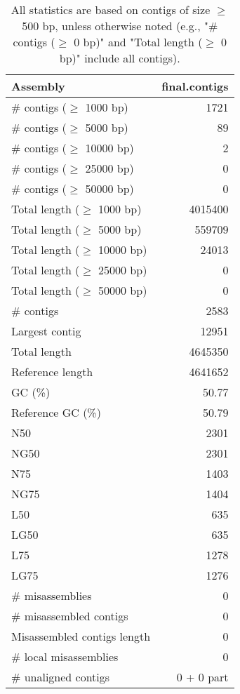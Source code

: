 \documentclass[12pt,a4paper]{article}
\begin{document}
\begin{table}[ht]
\begin{center}
\caption{All statistics are based on contigs of size $\geq$ 500 bp, unless otherwise noted (e.g., "\# contigs ($\geq$ 0 bp)" and "Total length ($\geq$ 0 bp)" include all contigs).}
\begin{tabular}{|l*{1}{|r}|}
\hline
Assembly & final.contigs \\ \hline
\# contigs ($\geq$ 1000 bp) & 1721 \\ \hline
\# contigs ($\geq$ 5000 bp) & 89 \\ \hline
\# contigs ($\geq$ 10000 bp) & 2 \\ \hline
\# contigs ($\geq$ 25000 bp) & 0 \\ \hline
\# contigs ($\geq$ 50000 bp) & 0 \\ \hline
Total length ($\geq$ 1000 bp) & 4015400 \\ \hline
Total length ($\geq$ 5000 bp) & 559709 \\ \hline
Total length ($\geq$ 10000 bp) & 24013 \\ \hline
Total length ($\geq$ 25000 bp) & 0 \\ \hline
Total length ($\geq$ 50000 bp) & 0 \\ \hline
\# contigs & 2583 \\ \hline
Largest contig & 12951 \\ \hline
Total length & 4645350 \\ \hline
Reference length & 4641652 \\ \hline
GC (\%) & 50.77 \\ \hline
Reference GC (\%) & 50.79 \\ \hline
N50 & 2301 \\ \hline
NG50 & 2301 \\ \hline
N75 & 1403 \\ \hline
NG75 & 1404 \\ \hline
L50 & 635 \\ \hline
LG50 & 635 \\ \hline
L75 & 1278 \\ \hline
LG75 & 1276 \\ \hline
\# misassemblies & 0 \\ \hline
\# misassembled contigs & 0 \\ \hline
Misassembled contigs length & 0 \\ \hline
\# local misassemblies & 0 \\ \hline
\# unaligned contigs & 0 + 0 part \\ \hline

\end{tabular}
\end{center}
\end{table}
\end{document}
